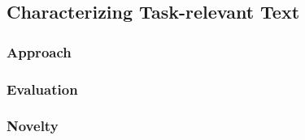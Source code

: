 

\subsection{Characterizing Task-relevant Text}



\subsubsection{Approach}



\subsubsection{Evaluation}



\subsubsection{Novelty}